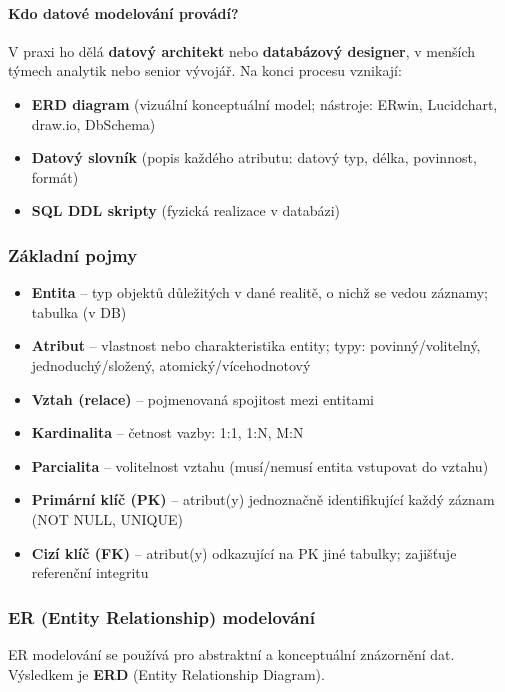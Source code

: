 \paragraph{Kdo datové modelování provádí?}
V praxi ho dělá \textbf{datový architekt} nebo \textbf{databázový designer}, v menších týmech analytik
nebo senior vývojář. Na konci procesu vznikají:
\begin{itemize}
  \item \textbf{ERD diagram} (vizuální konceptuální model; nástroje: ERwin, Lucidchart, draw.io, DbSchema)
  \item \textbf{Datový slovník} (popis každého atributu: datový typ, délka, povinnost, formát)
  \item \textbf{SQL DDL skripty} (fyzická realizace v databázi)
\end{itemize}

\subsubsection{Základní pojmy}

\begin{itemize}
  \item \textbf{Entita} -- typ objektů důležitých v dané realitě, o nichž se vedou záznamy; tabulka (v DB)
  \item \textbf{Atribut} -- vlastnost nebo charakteristika entity; typy: povinný/volitelný, jednoduchý/složený, atomický/vícehodnotový
  \item \textbf{Vztah (relace)} -- pojmenovaná spojitost mezi entitami
  \item \textbf{Kardinalita} -- četnost vazby: 1:1, 1:N, M:N
  \item \textbf{Parcialita} -- volitelnost vztahu (musí/nemusí entita vstupovat do vztahu)
  \item \textbf{Primární klíč (PK)} -- atribut(y) jednoznačně identifikující každý záznam (NOT NULL, UNIQUE)
  \item \textbf{Cizí klíč (FK)} -- atribut(y) odkazující na PK jiné tabulky; zajišťuje referenční integritu
\end{itemize}

\subsubsection{ER (Entity Relationship) modelování}

ER modelování se používá pro abstraktní a konceptuální znázornění dat. Výsledkem je \textbf{ERD} (Entity Relationship Diagram).

